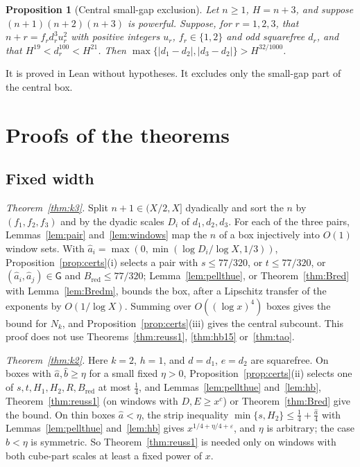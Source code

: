 \documentclass[11pt,reqno]{amsart}
\newtheorem{proposition}[theorem]{Proposition}
\theoremstyle{definition}
\theoremstyle{remark}
\numberwithin{equation}{section}
\newcommand{\Bred}{B_{\mathrm{red}}}
\begin{document}
\begin{proposition}[Central small-gap exclusion]\label{prop:centralgap}
Let $n\ge1$, $H=n+3$, and suppose $(n+1)(n+2)(n+3)$ is powerful. Suppose, for
$r=1,2,3$, that $n+r=f_rd_r^3u_r^2$ with positive integers $u_r$,
$f_r\in\{1,2\}$ and odd squarefree $d_r$, and that $H^{19}<d_r^{100}<H^{21}$. Then
$\max\{|d_1-d_2|,|d_3-d_2|\}>H^{32/1000}$.
\end{proposition}
It is proved in Lean without hypotheses. It excludes only the small-gap part of the central box.

\section{Proofs of the theorems}\label{sec:proofs}

\subsection{Fixed width}
\emph{Theorem~\ref{thm:k3}.} Split $n+1\in(X/2,X]$ dyadically and sort the
$n$ by $(f_1,f_2,f_3)$ and by the dyadic scales $D_i$ of $d_1,d_2,d_3$. For
each of the three pairs, Lemmas~\ref{lem:pair} and~\ref{lem:windows} map the
$n$ of a box injectively into $O(1)$ window sets. With
$\hat a_i=\max(0,\min(\log D_i/\log X,1/3))$, Proposition~\ref{prop:certs}(i)
selects a pair with $s\le77/320$, or $t\le77/320$, or $(\hat a_i,\hat a_j)\in\mathsf G$
and $\Bred\le77/320$; Lemma~\ref{lem:pellthue}, or Theorem~\ref{thm:Bred}
with Lemma~\ref{lem:Bredm}, bounds the box, after a Lipschitz transfer of the exponents by
$O(1/\log X)$. Summing over $O((\log x)^4)$ boxes gives the bound for $N_k$,
and Proposition~\ref{prop:certs}(iii) gives the central subcount.
This proof does not use
Theorems~\ref{thm:reuss1}, \ref{thm:hb15} or~\ref{thm:tao}.

\emph{Theorem~\ref{thm:k2}.} Here $k=2$, $h=1$, and $d=d_1$, $e=d_2$ are
squarefree. On boxes with $\hat a,\hat b\ge\eta$ for a small fixed $\eta>0$,
Proposition~\ref{prop:certs}(ii) selects one of $s,t,H_1,H_2,R,\Bred$ at most
$\frac14$, and Lemmas~\ref{lem:pellthue} and~\ref{lem:hb},
Theorem~\ref{thm:reuss1} (on windows with $D,E\ge x^{c}$) or
Theorem~\ref{thm:Bred} give the bound. On thin boxes $\hat a<\eta$, the strip
inequality $\min\{s,H_2\}\le\frac14+\frac{\hat a}4$ with
Lemmas~\ref{lem:pellthue} and~\ref{lem:hb} gives
$x^{1/4+\eta/4+\varepsilon}$, and $\eta$ is arbitrary; the case $\hat b<\eta$
is symmetric. So Theorem~\ref{thm:reuss1} is needed only on windows with both
cube-part scales at least a fixed power of $x$.
\end{document}
